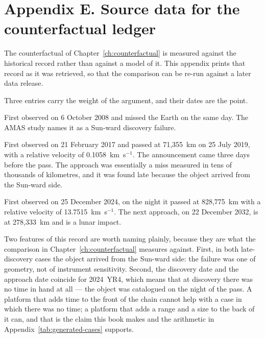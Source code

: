 \chapter*{Appendix E. Source data for the counterfactual ledger}
\thispagestyle{plain}

The counterfactual of Chapter~\ref{ch:counterfactual} is measured against
the historical record rather than against a model of it. This appendix
prints that record as it was retrieved, so that the comparison can be
re-run against a later data release.



Three entries carry the weight of the argument, and their dates are the
point.

\begin{description}[style=nextline,leftmargin=1.1em,labelindent=0pt,
  font=\normalfont\ttfamily\color{accent},itemsep=4pt,parsep=0pt]

\item[2008 TC3] First observed on 6 October 2008 and missed the Earth on
the same day. The AMAS study names it as a Sun-ward discovery failure.

\item[2019 OK] First observed on 21 February 2017 and passed at
71,355~km on 25 July 2019, with a relative velocity of 0.1058~km~s\(^{-1}\).
The announcement came three days before the pass. The approach was
essentially a miss measured in tens of thousands of kilometres, and it was
found late because the object arrived from the Sun-ward side.

\item[2024 YR4] First observed on 25 December 2024, on the night it passed
at 828,775~km with a relative velocity of 13.7515~km~s\(^{-1}\). The next
approach, on 22 December 2032, is at 278,333~km and is a lunar impact.
\end{description}

Two features of this record are worth naming plainly, because they are what
the comparison in Chapter~\ref{ch:counterfactual} measures against. First,
in both late-discovery cases the object arrived from the Sun-ward side: the
failure was one of geometry, not of instrument sensitivity. Second, the
discovery date and the approach date coincide for 2024~YR4, which means that
at discovery there was no time in hand at all --- the object was catalogued
on the night of the pass. A platform that adds time to the front of the
chain cannot help with a case in which there was no time; a platform that
adds a range and a size to the back of it can, and that is the claim this
book makes and the arithmetic in
Appendix~\ref{tab:generated-cases} supports.
\clearpage

